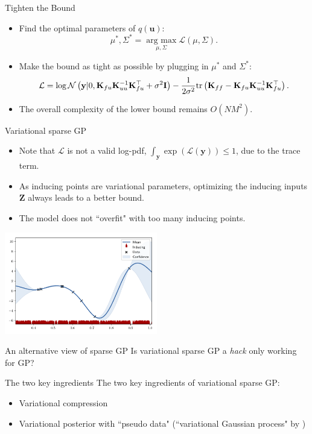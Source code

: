 \documentclass[14pt,aspectratio=1610]{beamer}
\newcommand{\yV}{\mathbf{y}}
\newcommand{\K}{\mathbf{K}}
\newcommand{\uV}{\mathbf{u}}
\newcommand{\zM}{\mathbf{Z}}
\newcommand{\bound}{\mathcal{L}}
\newcommand{\I}{\mathbf{I}}
\newcommand{\argmax}{\operatorname*{arg\: max}}
\begin{document}
\begin{frame}{Tighten the Bound}
\begin{itemize}
\item Find the optimal parameters of $q(\uV)$:
\[
\mu^*, \Sigma^* = \argmax_{\mu, \Sigma} \bound(\mu, \Sigma).
\]
\item Make the bound as tight as possible by plugging in $\mu^*$ and $\Sigma^*$:
\[
\bound = \log \gaussianDist{\yV}{0}{\K_{fu} \K_{uu}^{-1} \K_{fu}^\top+ \sigma^2\I} - \frac{1}{2\sigma^2}\tr{\K_{ff} - \K_{fu} \K_{uu}^{-1} \K_{fu}^\top}.
\]
\item The overall complexity of the lower bound remains $O(NM^2)$.
\end{itemize}
\end{frame}

\begin{frame}{Variational sparse GP}
\begin{itemize}
\item Note that $\bound$ is not a valid log-pdf, $\int_{\yV} \exp(\bound(\yV)) \leq 1$, due to the trace term.
\item As inducing points are variational parameters, optimizing the inducing inputs $\zM$ always leads to a better bound.
\item The model does not ``overfit" with too many inducing points. 
\end{itemize}
\vspace{-5mm}
\begin{center}
\includegraphics[width=0.5\textwidth]{sparsegp_example_lots_inducing_points.pdf} 
\end{center}
\end{frame}

\begin{frame}{An alternative view of sparse GP}
Is variational sparse GP a \textit{hack} only working for GP?
\end{frame}

\begin{frame}{The two key ingredients}
The two key ingredients of variational sparse GP:
\begin{itemize}
\item Variational compression \citep{HensmanLawrence2014}
\item Variational posterior with ``pseudo data" (``variational Gaussian process" by \cite{TranEtAl2016})
\end{itemize}
\end{frame}
\end{document}
